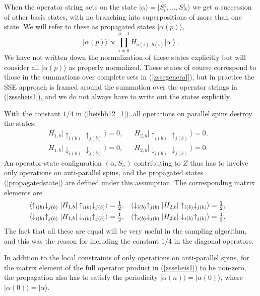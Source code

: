 \documentclass[draft,numberedheadings]{aipproc}
\newcommand{\dn}{\downarrow}
\newcommand{\up}{\uparrow}
\newcommand{\half}{\hbox{$\frac{1}{2}$}}
\begin{document}
When the operator string acts on the state $|\alpha\rangle=|S^z_i,\ldots,S^z_N\rangle$ we get a succession of other basis states, with no branching into 
superpositions of more than one state. We will refer to these as propagated states $|\alpha(p)\rangle$,
\begin{equation}
|\alpha(p)\rangle \propto \prod_{i=0}^{p-1} H_{a(i),b(i)} \left |\alpha \right \rangle .
\label{propagatedstate}
\end{equation}
We have not written down the normalization of these states explicitly but will consider all $|\alpha(p)\rangle$ as properly normalized. These states of
course correspond to those in the summations over complete sets in (\ref{zssegeneral}), but in practice the SSE approach is framed around the summation
over the operator strings in (\ref{zsseheis1}), and we do not always have to write out the states explicitly. 

With the constant $1/4$ in (\ref{heishb12_1}), all operations on parallel spins destroy the states;
\begin{eqnarray}
H_{1,b}|\up_{i(b)}\up_{j(b)}\rangle = 0,&& H_{2,b}|\up_{i(b)}\up_{j(b)}\rangle = 0,~~~\nonumber\\
H_{1,b}|\dn_{i(b)}\dn_{j(b)}\rangle = 0,&& H_{2,b}|\dn_{i(b)}\dn_{j(b)}\rangle = 0.
\end{eqnarray}
An operator-state configuration $(\alpha,S_n)$ contributing to $Z$ thus has to involve only operations on anti-parallel spins, and the propagated states 
(\ref{propagatedstate}) are defined under this assumption. The corresponding matrix elements are 
\begin{eqnarray}
\langle \up_{i(b)}\dn_{j(b)}|H_{1,b}|\up_{i(b)}\dn_{j(b)}\rangle = \half,&&
\langle \dn_{i(b)}\up_{j(b)}|H_{2,b}|\up_{i(b)}\dn_{j(b)}\rangle = \half,~~~\nonumber\\
\langle \dn_{i(b)}\up_{j(b)}|H_{1,b}|\dn_{i(b)}\up_{j(b)}\rangle = \half,&&
\langle \up_{i(b)}\dn_{j(b)}|H_{2,b}|\dn_{i(b)}\up_{j(b)}\rangle = \half.~~~
\label{heismatelems}
\end{eqnarray}
The fact that all these are equal will be very useful in the sampling algorithm, and this was the reason for including the constant $1/4$ in the 
diagonal operators. 

In addition to the local constraints of only operations on anti-parallel spins, for the matrix element of the full operator product in (\ref{zsseheis1}) 
to be non-zero, the propagation also has to satisfy the periodicity $|\alpha(n)\rangle = |\alpha(0)\rangle$, where $|\alpha(0)\rangle=|\alpha\rangle$. 
\end{document}
